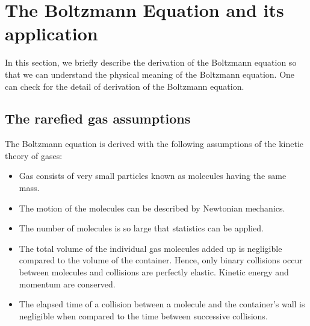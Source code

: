 \documentclass{article}
\begin{document}
\section{The Boltzmann Equation and its application}
In this section, we briefly describe the derivation of the Boltzmann equation so that we can understand the physical meaning of the Boltzmann equation. One can check \cite{RarefiedGasD, IntroBoltz} for the detail of derivation of the Boltzmann equation.
\subsection{The rarefied gas assumptions}
The Boltzmann equation is derived with the following assumptions of the kinetic theory of gases:
\begin{itemize}
\item Gas consists of very small particles known as molecules having the same mass.
\item The motion of the molecules can be described by Newtonian mechanics.
\item The number of molecules is so large that statistics can be applied.
\item The total volume of the individual gas molecules added up is negligible compared to the volume of the container. Hence, only binary collisions occur between molecules and collisions are perfectly elastic. Kinetic energy and momentum are conserved.
\item The elapsed time of a collision between a molecule and the container's wall is negligible when compared to the time between successive collisions.
\end{itemize}
\end{document}
